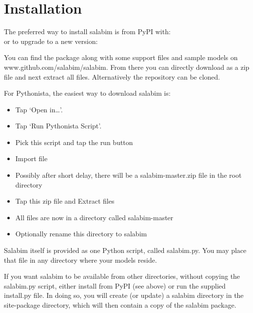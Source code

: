 \documentclass[letterpaper,10pt,english]{sphinxmanual}
\begin{document}
\section{Installation}
\label{\detokenize{Introduction:installation}}\begin{description}
\item[{The preferred way to install salabim is from PyPI with:}] \leavevmode
{}

\item[{or to upgrade to a new version:}] \leavevmode
{}

\end{description}

You can find the package along with some support files and sample models on www.github.com/salabim/salabim.
From there you can directly download as a zip file and next extract all files.
Alternatively the repository can be cloned. 

For Pythonista, the easiest way to download salabim is:
\begin{itemize}
\item {} 
Tap ‘Open in…’.

\item {} 
Tap ‘Run Pythonista Script’.

\item {} 
Pick this script and tap the run button

\item {} 
Import file

\item {} 
Possibly after short delay, there will be a salabim-master.zip file in the root directory

\item {} 
Tap this zip file and Extract files

\item {} 
All files are now in a directory called salabim-master

\item {} 
Optionally rename this directory to salabim

\end{itemize}

Salabim itself is provided as one Python script, called salabim.py.
You may place that file in any directory where your models reside. 

If you want salabim to be available from other directories, without copying the salabim.py script, either install from PyPI (see above)
or run the supplied install.py file.
In doing so, you will create (or update) a salabim directory in the site-package directory,
which will then contain a copy of the salabim package.
\end{document}
